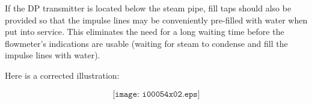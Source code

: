 \vskip 10pt

If the DP transmitter is located below the steam pipe, fill taps should also be provided so that the impulse lines may be conveniently pre-filled with water when put into service.  This eliminates the need for a long waiting time before the flowmeter's indications are usable (waiting for steam to condense and fill the impulse lines with water).

\vskip 10pt

Here is a corrected illustration:

$$\texttt{[image: i00054x02.eps]}$$




